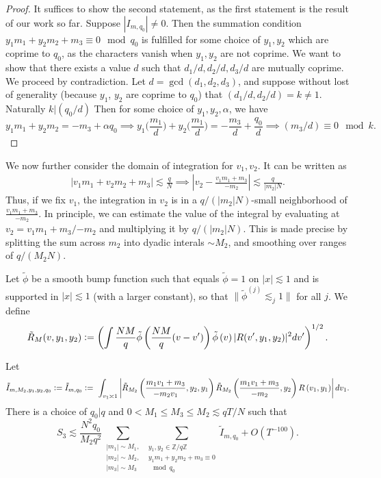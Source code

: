 \begin{proof}
	It suffices to show the second statement, as the first statement is the result of our work so far. 
	Suppose $|I_{m,q_0}|\neq 0$. Then the summation condition $y_1m_1+y_2m_2+m_3\equiv 0 \mod q_0$ is fulfilled for some choice of $y_1,y_2$ which are coprime to $q_0$, as the characters vanish when $y_1,y_2$ are not coprime. We want to show that there exists a value $d$ such that $d_1/d, d_2/d, d_3/d$ are mutually coprime. We proceed by contradiction. Let $d=\gcd(d_1,d_2,d_3)$, and suppose without lost of generality (because $y_1$, $y_2$ are coprime to $q_0$) that $(d_1/d,d_2/d)= k\neq 1$. Naturally $k|(q_0/d)$ Then for some choice of $y_1,y_2, \alpha$, we have \[
	y_1m_1+y_2m_2 = -m_3 + \alpha q_0 \implies y_1 \big(\frac{m_1}{d}\big)+ y_2 \big(\frac{m_1}{d}\big) = -\frac{m_3}{d} + \frac{q_0}{d} \implies (m_3/d) \equiv 0 \mod k.
	\]
\end{proof}

We now further consider the domain of integration for $v_1,v_2$. It can be written as\begin{align*}
	|v_1m_1+v_2m_2+m_3|\lesssim \frac{q}{N} \implies \left|v_2 - \frac{v_1m_1+m_3}{-m_2}\right|\lesssim \frac{q}{|m_2|N} .
\end{align*}
Thus, if we fix $v_1$, the integration in $v_2$ is in a ${q}/{(|m_2|N)}$-small neighborhood of $\frac{v_1m_1+m_3}{-m_2}$. In principle, we can estimate the value of the integral by evaluating at 
$v_2 = {v_1m_1+m_3}/{-m_2}$ and multiplying it by $q/(|m_2|N)$. This is made precise by splitting the sum across $m_2$ into dyadic interals $\sim M_2$, and smoothing over ranges of ${q}/{(M_2N)}$.

Let $\tilde{\phi}$ be a smooth bump function such that equals $\tilde{\phi}=1$ on $|x|\lesssim 1$ and is supported in $|x|\lesssim 1$ (with a larger constant), so that $\|\tilde{\phi}^{(j)}\lesssim_j 1\|$ for all $j$.
We define \[
\tilde{R}_M(v,y_1,y_2) \mathrel{\mathop:}=  \left( \int \frac{NM}{q}\tilde{\phi}\left(\frac{NM}{q}(v-v')\right)\tilde{\phi}\left(v\right)|R(v',y_1,y_2)|^2 dv'\right)^{1/2}.
\]
\begin{proposition} \label{dyadics_3}
	Let \[
	\tilde{I}_{m,M_2,y_1,y_2,q_0}\mathrel{\mathop:}= \tilde{I}_{m,q_0}\mathrel{\mathop:}= \ \int_{v_1\asymp 1} \left| \tilde{R}_{M_2}\left(\frac{m_1v_1+m_3}{-m_2v_1},y_2,y_1\right)
	\tilde{R}_{M_2}\left(\frac{m_1v_1+m_3}{-m_2},y_2\right)R\left(v_1,y_1\right)\right| dv_1.
	\]
	There is a choice of $q_0|q$ and $0<M_1\leq M_3 \leq M_2 \lesssim qT/N$ such that \[
	S_3\lesssim \frac{N^2q_0}{M_2q^2}\sum_{\substack{|m_1|\sim M_1,\\|m_2|\sim M_2,\\|m_3|\sim M_3}}\sum_{\substack{y_1,y_2 \in\mathbb{Z}/q\mathbb{Z} \\ y_1m_1+y_2m_2+m_3\equiv 0 \\ \mod q_0}}\tilde{I}_{m,q_0}+O(T^{-100}).
	\]
\end{proposition}


